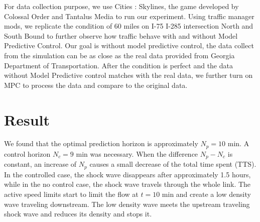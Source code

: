 \documentclass{article}
\begin{document}
For data collection purpose, we use Cities : Skylines, the game developed by Colossal Order and Tantalus Media to run our experiment. Using traffic manager mods, we replicate the condition of 60 miles on I-75 I-285 intersection North and South Bound to further observe how traffic behave with and without Model Predictive Control. Our goal is without model predictive control, the data collect from the simulation can be as close as the real data provided from Georgia Department of Transportation. After the condition is perfect and the data without Model Predictive control matches with the real data, we further turn on MPC to process the data and compare to the original data.
\section*{Result}
We found that the optimal prediction horizon is approximately $N_p=10$ min. A control horizon $N_c=9$ min was necessary. When the difference $N_p-N_c$ is constant, an increase of $N_p$ causes a small decrease of the total time spent (TTS). In the controlled case, the shock wave disappears after approximately 1.5 hours, while in the no control case, the shock wave travels through the whole link. The active speed limits start to limit the flow at $t=10$ min and create a low density wave traveling downstream. The low density wave meets the upstream traveling shock wave and reduces its density and stops it.
\end{document}
